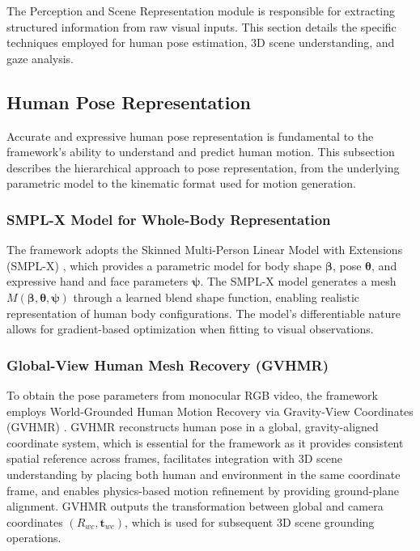 The Perception and Scene Representation module is responsible for extracting structured information from raw visual inputs. This section details the specific techniques employed for human pose estimation, 3D scene understanding, and gaze analysis.

\subsection{Human Pose Representation}

Accurate and expressive human pose representation is fundamental to the framework's ability to understand and predict human motion. This subsection describes the hierarchical approach to pose representation, from the underlying parametric model to the kinematic format used for motion generation.

\subsubsection{SMPL-X Model for Whole-Body Representation}

The framework adopts the Skinned Multi-Person Linear Model with Extensions (SMPL-X) \citep{SMPL-X:2019}, which provides a parametric model for body shape $\boldsymbol{\beta}$, pose $\boldsymbol{\theta}$, and expressive hand and face parameters $\boldsymbol{\psi}$. The SMPL-X model generates a mesh $M(\boldsymbol{\beta}, \boldsymbol{\theta}, \boldsymbol{\psi})$ through a learned blend shape function, enabling realistic representation of human body configurations. The model's differentiable nature allows for gradient-based optimization when fitting to visual observations.

\subsubsection{Global-View Human Mesh Recovery (GVHMR)}

To obtain the pose parameters from monocular RGB video, the framework employs World-Grounded Human Motion Recovery via Gravity-View Coordinates (GVHMR) \citep{multi-hmr2024, gvhmr}. GVHMR reconstructs human pose in a global, gravity-aligned coordinate system, which is essential for the framework as it provides consistent spatial reference across frames, facilitates integration with 3D scene understanding by placing both human and environment in the same coordinate frame, and enables physics-based motion refinement by providing ground-plane alignment. GVHMR outputs the transformation between global and camera coordinates $(R_{wc}, \mathbf{t}_{wc})$, which is used for subsequent 3D scene grounding operations.

